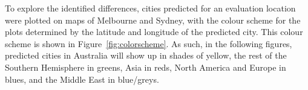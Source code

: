 \documentclass[Crown,sageh,times]{sagej}
\begin{document}
\begin{landscape}
\begin{table}[!htbp]
\begin{subtable}{.34\linewidth}
\caption{GSV-BSV}
\label{tab:melbournesydneyGSV} 
\end{subtable}%
\end{table}
\end{landscape}







To explore the identified differences, cities predicted for an evaluation location were plotted on maps of Melbourne and Sydney, with the colour scheme for the plots determined by the latitude and longitude of the predicted city. This colour scheme is shown in Figure~\ref{fig:colorscheme}.  As such, in the following figures, predicted cities in Australia will show up in shades of yellow, the rest of the Southern Hemisphere in greens, Asia in reds, North America and Europe in blues, and the Middle East in blue/greys.
\end{document}
